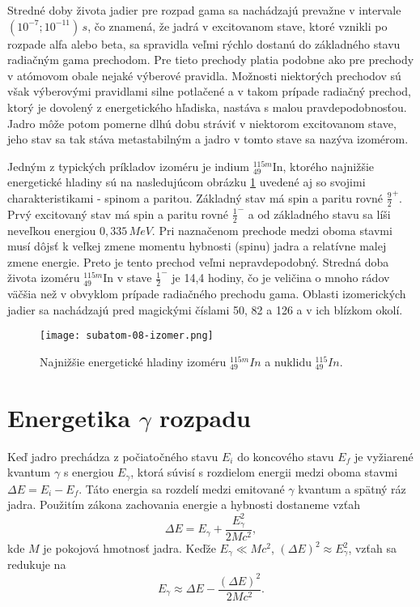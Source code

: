 \documentclass[../../main.tex]{subfiles}
\begin{document}
Stredné doby života jadier pre rozpad gama sa nachádzajú prevažne v intervale $(10^{-7}; 10^{-11})\,s$, čo znamená, že jadrá v excitovanom stave, ktoré vznikli po rozpade alfa alebo beta, sa spravidla veľmi rýchlo dostanú do základného stavu radiačným gama prechodom. Pre tieto prechody platia podobne ako pre prechody v atómovom obale nejaké výberové pravidla. Možnosti niektorých prechodov sú však výberovými pravidlami silne potlačené a v takom prípade radiačný prechod, ktorý je dovolený z energetického hľadiska, nastáva s malou pravdepodobnosťou. Jadro môže potom pomerne dlhú dobu stráviť v niektorom excitovanom stave, jeho stav sa tak stáva metastabilným a jadro v tomto stave sa nazýva izomérom.

Jedným z typických príkladov izoméru je indium $^{115m}_{49}$In, ktorého najnižšie energetické hladiny sú na nasledujúcom obrázku \ref{sf8:fig:izomer} uvedené aj so svojimi charakteristikami - spinom a paritou. Základný stav má spin a paritu rovné $\frac{9}{2}^+$. Prvý excitovaný stav má spin a paritu rovné $\frac{1}{2}^-$ a od základného stavu sa líši neveľkou energiou $0,335\,\unit{MeV}$. Pri naznačenom prechode medzi oboma stavmi musí dôjsť k veľkej zmene momentu hybnosti (spinu) jadra a relatívne malej zmene energie. Preto je tento prechod veľmi nepravdepodobný. Stredná doba života izoméru $^{115m}_{49}$In v stave $\frac{1}{2}^-$ je 14,4 hodiny, čo je veličina o mnoho rádov väčšia než v obvyklom prípade radiačného prechodu gama. Oblasti izomerických jadier sa nachádzajú pred magickými číslami 50, 82 a 126 a v ich blízkom okolí.

\begin{figure}[!h]
\texttt{[image: subatom-08-izomer.png]}
\centering
\caption{Najnižšie energetické hladiny izoméru $^{115m}_{49}In$ a nuklidu $^{115}_{49}In$.}
\label{sf8:fig:izomer}
\end{figure}

\section{Energetika $\gamma$ rozpadu}
Keď jadro prechádza z počiatočného stavu $E_i$ do koncového stavu $E_f$ je vyžiarené kvantum $\gamma$ s energiou $E_{\gamma}$, ktorá súvisí s rozdielom energii medzi oboma stavmi  $\Delta E = E_i - E_f$. Táto energia sa rozdelí medzi emitované $\gamma$ kvantum a spätný ráz jadra. Použitím zákona zachovania energie a hybnosti dostaneme vzťah
$$ \Delta E = E_{\gamma} + \frac{E^2_{\gamma}}{2Mc^2}, $$
kde $M$ je pokojová hmotnosť jadra. Keďže $E_{\gamma} \ll Mc^2$, $(\Delta E)^2 \approx E^2_{\gamma}$, vzťah sa redukuje na 
$$ E_{\gamma} \approx \Delta E - \frac{(\Delta E)^2}{2Mc^2}. $$
\end{document}
